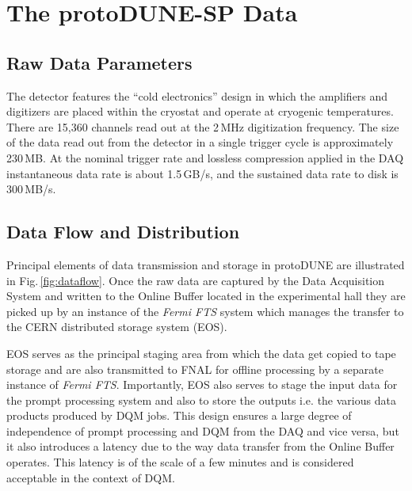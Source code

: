 \documentclass{webofc}
\newcommand{\pd}{protoDUNE\xspace}
\begin{document}
\section{The protoDUNE-SP Data}
\subsection{Raw Data Parameters}
\label{sec:np04_data_rate}

The detector features the ``cold electronics'' design in which the amplifiers and digitizers
are placed within the cryostat and operate at cryogenic temperatures.
There are 15,360 channels read out at the 2\,MHz digitization frequency. The size of the data
read out from the detector in a single trigger cycle is approximately 230\,MB. At the nominal
trigger rate and lossless compression applied in the DAQ instantaneous data rate is about
1.5\,GB/s, and the sustained data rate to disk is 300\,MB/s.

\subsection{Data Flow and Distribution}
Principal elements of data transmission and storage in \pd are illustrated in Fig.\,\ref{fig:dataflow}.
Once the raw data are captured by the Data Acquisition System and written to the Online Buffer
located in the experimental hall  they are picked up by an instance of the \textit{Fermi FTS} system
\cite{sam,fts} which manages the transfer to the CERN distributed storage system (EOS).

EOS serves as the principal staging area from which the data get copied to tape storage and
are also transmitted to FNAL for offline processing by a separate instance of \textit{Fermi FTS}.
Importantly, EOS also serves to stage the input data for the prompt processing system and also to
store the outputs i.e. the various data products produced by DQM jobs. This design ensures
a large degree of independence of prompt processing and DQM from the DAQ and vice versa, but
it also introduces a latency due to the way data transfer from the Online Buffer operates. This latency is
of the scale of a few minutes and is considered acceptable in the context of DQM.
\end{document}
